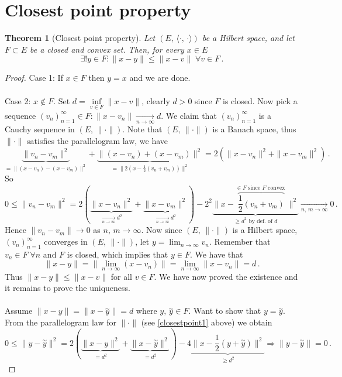 \documentclass[12pt, a4paper]{article}
\newtheorem{theorem}{Theorem}[section]
\begin{document}
\section{Closest point property}
\begin{theorem}[Closest point property]
Let $(E,\,\langle\cdot,\,\cdot\rangle)$ be a Hilbert space, and let $F\subset E$ be a closed and convex set. Then, for every $x\in E$
\[
    \exists! y\in F:\|x-y\|\leq \|x-v\|\;\forall v\in F\,.
\]
\end{theorem}
\begin{proof}
Case 1: If $x\in F$ then $y=x$ and we are done.
\\\\
Case 2: $x\not\in F$. Set $d=\underset{v\in F}{\operatorname{inf}}\|x-v\|$, clearly $d>0$ since $F$ is closed. Now pick a sequence $(v_n)_{n=1}^\infty\in F:\|x-v_n\|\underset{n\to\infty}{\longrightarrow}d$. We claim that $(v_n)_{n=1}^\infty$ is a Cauchy sequence in $(E,\,\|\cdot\|)$. Note that $(E,\,\|\cdot\|)$ is a Banach space, thus $\|\cdot\|$ satisfies the parallelogram law, we have
\[
    \underbrace{\|v_n-v_m\|^2}_{=\|(x-v_n)-(x-v_m)\|^2}+\underbrace{\|(x-v_n)+(x-v_m)\|^2}_{=\|2(x-\frac{1}{2}(v_n+v_m))\|^2}=2(\|x-v_n\|^2+\|x-v_m\|^2)\,.
\]
So
\begin{equation}
0\leq\|v_n-v_m\|^2=2(\underbrace{\|x-v_n\|^2}_{\underset{n\to\infty}{\longrightarrow}d^2}+\underbrace{\|x-v_m\|^2}_{\underset{n\to\infty}{\longrightarrow}d^2})-2^2\underbrace{\|x-\overbrace{\frac{1}{2}(v_n+v_m)}^{\in F \text{ since $F$ convex }}\|^2}_{\geq d^2\text{ by def. of }d}\underset{n,\,m\to\infty}{\longrightarrow}0\,.
\label{closestpoint1}
\end{equation}
Hence $\|v_n-v_m\|\to 0$ as $n,\,m\to\infty$. Now since $(E,\,\|\cdot\|)$ is a Hilbert space, $(v_n)_{n=1}^\infty$ converges in $(E,\,\|\cdot\|)$, let $y=\lim_{n\to\infty} v_n$. Remember that $v_n\in F\;\forall n$ and $F$ is closed, which implies that $y\in F$. We have that
\[
    \|x-y\|=\|\lim_{n\to\infty}(x-v_n)\|=\lim_{n\to\infty}\|x-v_n\|=d\,.
\]
Thus $\|x-y\|\leq\|x-v\|$ for all $v\in F$. We have now proved the existence and it remains to prove the uniqueness.
\\\\
Assume $\|x-y\|=\|x-\overset{\sim}{y}\|=d$ where $y,\,\overset{\sim}{y}\in F$. Want to show that $y=\overset{\sim}{y}$. From the parallelogram law for $\|\cdot\|$ (see \eqref{closestpoint1} above) we obtain
\[
    0\leq\|y-\overset{\sim}{y}\|^2=2(\underbrace{\|x-y\|^2}_{=d^2}+\underbrace{\|x-\overset{\sim}{y}\|^2}_{=d^2})-4\underbrace{\|x-\frac{1}{2}(y+\overset{\sim}{y})\|^2}_{\geq d^2}\Rightarrow \|y-\overset{\sim}{y}\|=0\,.
\]
\end{proof}
\end{document}
